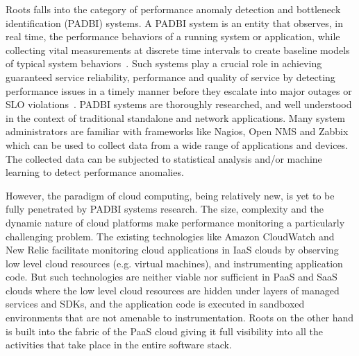 Roots falls into the category of performance anomaly detection and bottleneck identification (PADBI) systems.
A PADBI system is an entity that observes, in real time, the performance behaviors
of a running system or application, while collecting vital measurements at discrete time intervals to create baseline
models of typical system behaviors~\cite{Ibidunmoye:2015:PAD:2808687.2791120}. 
Such systems play a crucial role in achieving guaranteed service reliability, performance and
quality of service by detecting performance issues in a timely manner before they escalate into major outages
or SLO violations~\cite{6045942}. 
PADBI systems are thoroughly researched, and well understood in the context of traditional standalone and
network applications. Many system administrators are familiar with frameworks like Nagios, Open NMS and Zabbix which
can be used to collect data from a wide range of applications and devices. The collected data can be
subjected to statistical analysis and/or machine learning to detect performance anomalies. 

However, the paradigm of cloud computing, being relatively new, is yet to be
fully penetrated by PADBI systems research. The size, complexity and the dynamic nature of 
cloud platforms make performance monitoring a particularly challenging problem.
The existing technologies like Amazon CloudWatch
and New Relic facilitate monitoring cloud applications in IaaS clouds by observing low level
cloud resources (e.g. virtual machines), and instrumenting application code. But such technologies
are neither viable nor sufficient in
PaaS and SaaS clouds where the low level cloud resources are hidden under layers of managed
services and SDKs, and the application code is executed in sandboxed environments that are not
amenable to instrumentation. Roots on the other hand is built into the 
fabric of the PaaS cloud giving it full visibility into all the activities that take place in the entire
software stack.

